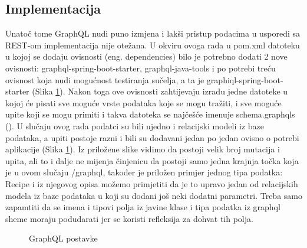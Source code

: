 \documentclass[times, utf8, zavrsni]{fer}
\begin{document}
\subsection{Implementacija}
Unatoč tome GraphQL nudi puno izmjena i lakši pristup podacima u usporedi sa REST-om implementacija
nije otežana. U okviru ovoga rada u pom.xml datoteku u kojoj se dodaju ovisnosti (eng. dependencies)
bilo je potrebno dodati 2 nove ovisnosti: graphql-spring-boot-starter, graphql-java-tools
i po potrebi treću ovisnost koja nudi mogućnost testiranja sučelja,
a ta je graphiql-spring-boot-starter (Slika \ref{fig:graphql}). Nakon toga ove ovisnosti zahtijevaju
izradu jedne datoteke u kojoj će pisati sve moguće vrste podataka koje se mogu tražiti, i sve
moguće upite koji se mogu primiti i takva datoteka se najčešće imenuje schema.graphqls ().
U slučaju ovog rada podatci su bili ujedno i relacijski modeli iz baze podataka,
a upiti postoje razni i bili su dodavani jedan po jedan ovisno o potrebi aplikacije (Slika \ref{fig:graphql}).
Iz priložene slike vidimo da postoji velik broj mutacija i upita, ali to i dalje ne mijenja činjenicu da postoji
samo jedna krajnja točka koja je u ovom slučaju /graphql, također je priložen primjer jednog tipa podatka: Recipe
i iz njegovog opisa možemo primjetiti da je to upravo jedan od relacijskih modela iz baze podataka u koji su dodani
još neki dodatni parametri. Treba samo zapamtiti da se imena i tipovi polja iz javine klase i tipa podatka iz
graphql sheme moraju podudarati jer se koristi refleksija za dohvat tih polja.
\begin{figure}[h]
      \centering
      \caption{GraphQL postavke}
      \label{fig:graphql}
\end{figure}
\end{document}
